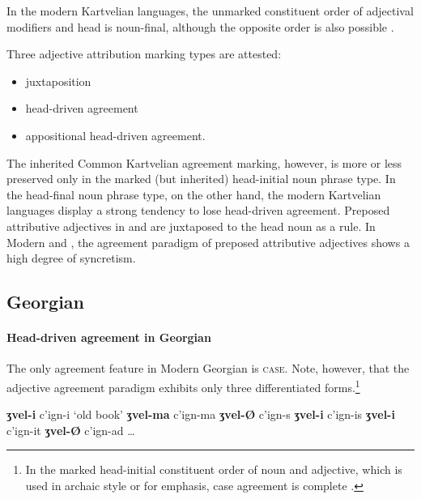 In the modern Kartvelian languages, the unmarked constituent order of adjectival modifiers and head is noun-final, although the opposite order is also possible \citep[56]{harris1991a}.

Three adjective attribution marking types are attested:
\begin{itemize}
\item juxtaposition
\item head\hyp{}driven agreement
\item appositional head\hyp{}driven agreement.
\end{itemize}
The inherited Common Kartvelian agreement marking, however, is more or less preserved only in the marked (but inherited) head-initial noun phrase type. In the head-final noun phrase type, on the other hand, the modern Kartvelian languages display a strong tendency to lose head\hyp{}driven agreement. Preposed attributive adjectives in  and  are juxtaposed to the head noun as a rule. In Modern  and , the agreement paradigm of preposed attributive adjectives shows a high degree of syncretism.

\subsection{Georgian}
\label{georgian synchr}
\paragraph*{Head\hyp{}driven agreement in Georgian}
The only agreement feature in Modern Georgian is \textsc{case}. Note, however, that the adjective agreement paradigm exhibits only three differentiated forms.\footnote{In the marked head-initial constituent order of noun and adjective, which is used in archaic style or for emphasis, case agreement is complete \citep[59]{tuite1998}.}
\begin{exe}
\settowidth{}
\label{georgian old}
\begin{xlist}
\ex \textbf{ʒvel-i} c'ign-i		{\rm ‘old book’}	
\ex \textbf{ʒvel-ma} c'ign-ma				
\ex \textbf{ʒvel-Ø} c'ign-s					
\ex \textbf{ʒvel-i} c'ign-is					
\ex \textbf{ʒvel-i} c'ign-it					
\ex \textbf{ʒvel-Ø} c'ign-ad					
\ex \dots
\end{xlist}
\end{exe}

